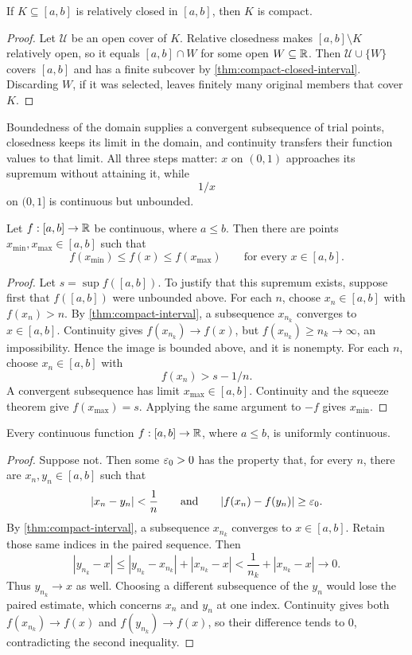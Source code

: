 \begin{corollary}
\label{cor:closed-subset-finite-subcover}
If $K\subseteq[a,b]$ is relatively closed in $[a,b]$, then $K$ is compact.
\end{corollary}
\begin{proof}
Let $\mathcal U$ be an open cover of $K$. Relative closedness makes
$[a,b]\setminus K$ relatively open, so it equals $[a,b]\cap W$ for some
open $W\subseteq\mathbb{R}$. Then $\mathcal U\cup\{W\}$ covers $[a,b]$ and has a
finite subcover by \cref{thm:compact-closed-interval}. Discarding $W$, if
it was selected, leaves finitely many original members that cover $K$.
\end{proof}

Boundedness of the domain supplies a convergent subsequence of trial
points, closedness keeps its limit in the domain, and continuity transfers
their function values to that limit. All three steps matter: $x$ on
$(0,1)$ approaches its supremum without attaining it, while
\[
1/x
\]
 on
$(0,1]$ is continuous but unbounded.

\begin{theorem}
\label{thm:extreme-value}
Let $f:[a,b]\to\mathbb{R}$ be continuous, where $a\leq b$. Then there are points $x_{\min},x_{\max}\in[a,b]$ such that
\[
f(x_{\min})\leq f(x)\leq f(x_{\max})
\qquad\text{for every }x\in[a,b].
\]
\end{theorem}
\begin{proof}
Let $s=\sup f([a,b])$. To justify that this supremum exists, suppose first that $f([a,b])$ were unbounded above. For each $n$, choose $x_n\in[a,b]$ with $f(x_n)>n$. By \cref{thm:compact-interval}, a subsequence $x_{n_k}$ converges to $x\in[a,b]$. Continuity gives $f(x_{n_k})\to f(x)$, but $f(x_{n_k})\geq n_k\to\infty$, an impossibility. Hence the image is bounded above, and it is nonempty. For each $n$, choose $x_n\in[a,b]$ with
\[
f(x_n)>s-1/n.
\]
 A convergent subsequence has limit $x_{\max}\in[a,b]$. Continuity and the squeeze theorem give $f(x_{\max})=s$. Applying the same argument to $-f$ gives $x_{\min}$.
\end{proof}

\begin{theorem}
\label{thm:heine-cantor}
Every continuous function $f:[a,b]\to\mathbb{R}$, where $a\leq b$, is uniformly continuous.
\end{theorem}
\begin{proof}
Suppose not. Then some $\varepsilon_0>0$ has the property that, for every $n$, there are $x_n,y_n\in[a,b]$ such that
\[
\lvert x_n-y_n\rvert<\frac1n
\qquad\text{and}\qquad
\lvert f(x_n)-f(y_n)\rvert\geq\varepsilon_0.
\]
By \cref{thm:compact-interval}, a subsequence $x_{n_k}$ converges to $x\in[a,b]$. Retain those same indices in the paired sequence. Then
\[
|y_{n_k}-x|\leq|y_{n_k}-x_{n_k}|+|x_{n_k}-x|
<\frac1{n_k}+|x_{n_k}-x|\longrightarrow0.
\]
Thus $y_{n_k}\to x$ as well. Choosing a different subsequence of the $y_n$
would lose the paired estimate, which concerns $x_n$ and $y_n$ at one index. Continuity gives both $f(x_{n_k})\to f(x)$ and $f(y_{n_k})\to f(x)$, so their difference tends to $0$, contradicting the second inequality.
\end{proof}



